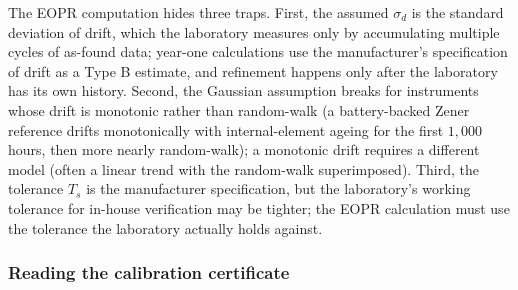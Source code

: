 The EOPR computation hides three traps. First, the assumed
$\sigma_{d}$ is the standard deviation of drift, which the
laboratory measures only by accumulating multiple cycles of
as-found data; year-one calculations use the manufacturer's
specification of drift as a Type B estimate, and refinement
happens only after the laboratory has its own history. Second,
the Gaussian assumption breaks for instruments whose drift is
monotonic rather than random-walk (a battery-backed Zener
reference drifts monotonically with internal-element ageing for
the first $1{,}000$ hours, then more nearly random-walk); a
monotonic drift requires a different model (often a linear
trend with the random-walk superimposed). Third, the tolerance
$T_{s}$ is the manufacturer specification, but the laboratory's
working tolerance for in-house verification may be tighter; the
EOPR calculation must use the tolerance the laboratory actually
holds against.

\subsubsection*{Reading the calibration certificate}

